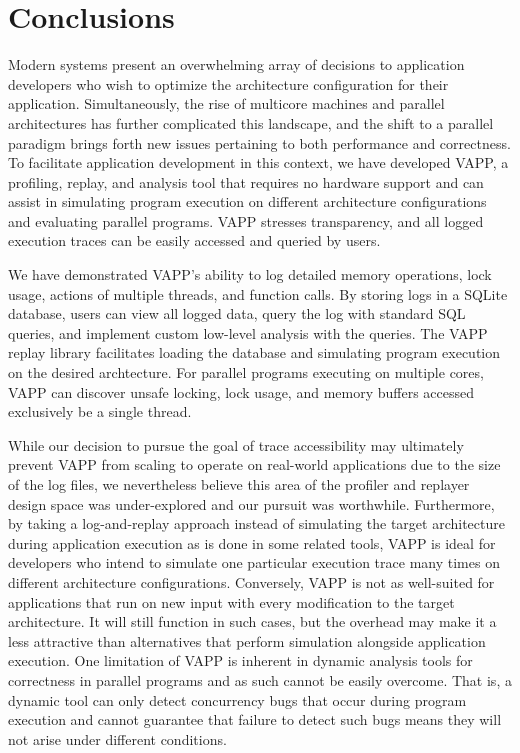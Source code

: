 \section{Conclusions}
Modern systems present an overwhelming array of decisions to
application developers who wish to optimize the architecture 
configuration for their application.  Simultaneously, the
rise of multicore machines and parallel architectures has
further complicated this landscape, and the shift to a parallel
paradigm brings forth new issues pertaining to both performance
and correctness.  To facilitate application development in this
context, we have developed VAPP, a profiling, replay, and analysis tool that 
requires no hardware support and can assist in simulating
program execution on different architecture configurations and
evaluating parallel programs.  VAPP stresses transparency, and
all logged execution traces can be easily accessed and queried
by users.

We have demonstrated VAPP's ability to log detailed memory operations,
lock usage, actions of multiple threads, and function calls.  By
storing logs in a SQLite database, users can view all logged data,
query the log with standard SQL queries, and implement custom
low-level analysis with the queries.  The VAPP replay library
facilitates loading the database and simulating program execution
on the desired archtecture.  For parallel programs executing on multiple
cores, VAPP can discover unsafe locking, lock usage, and memory
buffers accessed exclusively be a single thread.

While our decision to pursue the goal of trace accessibility may
ultimately prevent VAPP from scaling to operate on real-world
applications due to the size of the log files, we nevertheless
believe this area of the profiler and replayer
design space was under-explored and our pursuit was worthwhile.
Furthermore, by taking a log-and-replay approach instead of
simulating the target architecture during application execution
as is done in some related tools, VAPP is ideal for developers
who intend to simulate one particular execution trace many
times on different architecture configurations.  Conversely,
VAPP is not as well-suited for applications that run on new
input with every modification to the target architecture.  It will
still function in such cases, but the overhead may make it a less
attractive than alternatives that perform simulation alongside
application execution.  One limitation of VAPP is inherent in
dynamic analysis tools for correctness in parallel programs and
as such cannot be easily overcome.  That is, a dynamic tool
can only detect concurrency bugs that occur during program
execution and cannot guarantee that failure to detect such
bugs means they will not arise under different conditions.

